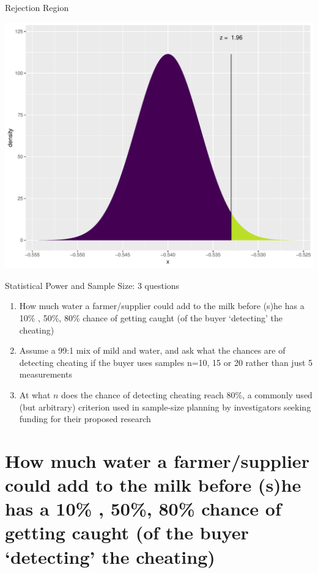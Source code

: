 \documentclass{beamer}\usepackage[]{graphicx}\usepackage[]{color}
\newenvironment{knitrout}{}{} %
\begin{document}
\begin{frame}[fragile]{Rejection Region}
\begin{minipage}{0.47\textwidth}
\begin{knitrout}
{\centering \includegraphics[width=1\linewidth]{figure/unnamed-chunk-5-1} 

}



\end{knitrout}
\end{minipage}	
	

\end{frame}

\begin{frame}{Statistical Power and Sample Size: 3 questions}

\begin{enumerate}
	\setlength\itemsep{1em}
	\item How much water a farmer/supplier could add to the milk before (s)he has a 10\% , 50\%, 80\%
	chance of getting caught (of the buyer ‘detecting’ the cheating)
	\item Assume a 99:1 mix of mild and water, and ask what the chances are of detecting cheating if the buyer uses samples
	n=10, 15 or 20 rather than just 5 measurements
	\item At what $n$ does the chance of detecting cheating reach 80\%, a commonly used (but arbitrary) criterion used in sample-size planning by investigators seeking funding for their proposed research
\end{enumerate}
\end{frame}

\section{How much water a farmer/supplier could add to the milk before (s)he has a 10\% , 50\%, 80\%
	chance of getting caught (of the buyer ‘detecting’ the cheating)}
\end{document}
